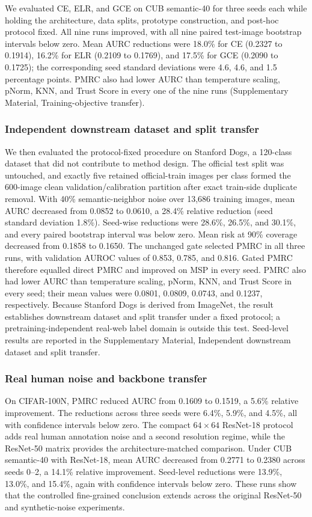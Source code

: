 \documentclass[review,times]{elsarticle}
\newcommand{\method}{PMRC}
\begin{document}
We evaluated CE, ELR, and GCE on CUB semantic-40 for three seeds each while holding the architecture, data splits, prototype construction, and post-hoc protocol fixed. All nine runs improved, with all nine paired test-image bootstrap intervals below zero. Mean AURC reductions were 18.0\% for CE (0.2327 to 0.1914), 16.2\% for ELR (0.2109 to 0.1769), and 17.5\% for GCE (0.2090 to 0.1725); the corresponding seed standard deviations were 4.6, 4.6, and 1.5 percentage points. PMRC also had lower AURC than temperature scaling, pNorm, KNN, and Trust Score in every one of the nine runs (Supplementary Material, Training-objective transfer).

\subsubsection{Independent downstream dataset and split transfer}

We then evaluated the protocol-fixed procedure on Stanford Dogs, a 120-class dataset that did not contribute to method design. The official test split was untouched, and exactly five retained official-train images per class formed the 600-image clean validation/calibration partition after exact train-side duplicate removal. With 40\% semantic-neighbor noise over 13,686 training images, mean AURC decreased from 0.0852 to 0.0610, a 28.4\% relative reduction (seed standard deviation 1.8\%). Seed-wise reductions were 28.6\%, 26.5\%, and 30.1\%, and every paired bootstrap interval was below zero. Mean risk at 90\% coverage decreased from 0.1858 to 0.1650. The unchanged gate selected PMRC in all three runs, with validation AUROC values of 0.853, 0.785, and 0.816. Gated PMRC therefore equalled direct PMRC and improved on MSP in every seed. PMRC also had lower AURC than temperature scaling, pNorm, KNN, and Trust Score in every seed; their mean values were 0.0801, 0.0809, 0.0743, and 0.1237, respectively. Because Stanford Dogs is derived from ImageNet, the result establishes downstream dataset and split transfer under a fixed protocol; a pretraining-independent real-web label domain is outside this test. Seed-level results are reported in the Supplementary Material, Independent downstream dataset and split transfer.

\subsubsection{Real human noise and backbone transfer}

On CIFAR-100N, \method{} reduced AURC from 0.1609 to 0.1519, a 5.6\% relative improvement. The reductions across three seeds were 6.4\%, 5.9\%, and 4.5\%, all with confidence intervals below zero. The compact $64\times64$ ResNet-18 protocol adds real human annotation noise and a second resolution regime, while the ResNet-50 matrix provides the architecture-matched comparison. Under CUB semantic-40 with ResNet-18, mean AURC decreased from 0.2771 to 0.2380 across seeds 0--2, a 14.1\% relative improvement. Seed-level reductions were 13.9\%, 13.0\%, and 15.4\%, again with confidence intervals below zero. These runs show that the controlled fine-grained conclusion extends across the original ResNet-50 and synthetic-noise experiments.
\end{document}
